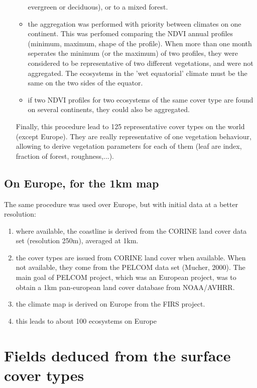 \begin{enumerate}
\begin{itemize}
evergreen or deciduous), or to a mixed forest.
\item the aggregation was performed with priority between climates
on one continent. This was perfomed comparing the NDVI annual profiles
(minimum, maximum, shape of the profile).
When more than one month seperates the minimum (or the maximum)
of two profiles, they were considered to be representative of two
different vegetations, and were not aggregated.
The ecosystems in the 'wet equatorial' climate must be the same on the two
sides of the equator.
\item if two NDVI profiles for two ecosystems of the same cover type are
found on several continents, they could also be aggregated.
\end{itemize}
Finally, this procedure lead to 125 representative cover types on the world
(except Europe). They are really
representative of one vegetation behaviour, allowing to derive
vegetation parameters for each of them (leaf are index, fraction of forest,
roughness,...).
\end{enumerate}


\subsection{On Europe, for the 1km map}

The same procedure was used over Europe, but with initial data at a
better resolution:

\begin{enumerate}
\item where available, the coastline is derived
from the CORINE land cover data set (resolution 250m), averaged at 1km.
\item the cover types are issued from CORINE land cover when available.
When not available, they come from the PELCOM data set
(Mucher, 2000). The main goal of PELCOM project, which was an European project,
was to obtain a 1km pan-european land cover database from NOAA/AVHRR.
\item the climate map is derived on Europe from the FIRS project.
\item this leads to about 100 ecosystems on Europe
\end{enumerate}


\newpage

\section{Fields deduced from the surface cover types}

